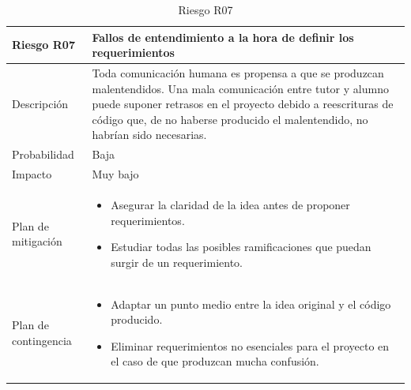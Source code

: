 \begin{table}[H]
	\centering
	\footnotesize
	\begin{tabularx}{\textwidth}{|l|X|}
		\hline
		\rowcolor[HTML]{C0C0C0} 
		\textbf{Riesgo R07}  & \textbf{Fallos de entendimiento a la hora de definir los requerimientos} \\ \hline
		Descripción          & Toda comunicación humana es propensa a que se produzcan malentendidos. Una mala comunicación entre tutor y alumno puede suponer retrasos en el proyecto debido a reescrituras de código que, de no haberse producido el malentendido, no habrían sido necesarias. \\ \hline
		Probabilidad         & Baja \\ \hline
		Impacto              & Muy bajo \\ \hline
		Plan de mitigación   & \begin{minipage}[t]{\linewidth}
			\begin{itemize}[leftmargin=*, noitemsep]
				\item Asegurar la claridad de la idea antes de proponer requerimientos.
				\item Estudiar todas las posibles ramificaciones que puedan surgir de un requerimiento.
			\end{itemize}
		\end{minipage} \\ \hline
		Plan de contingencia & \begin{minipage}[t]{\linewidth}
			\begin{itemize}[leftmargin=*, noitemsep]
				\item Adaptar un punto medio entre la idea original y el código producido.
				\item Eliminar requerimientos no esenciales para el proyecto en el caso de que produzcan mucha confusión.
			\end{itemize}
		\end{minipage} \\ \hline
	\end{tabularx}
	\caption{Riesgo R07}
	\label{tab:riesgo_7}
\end{table}

